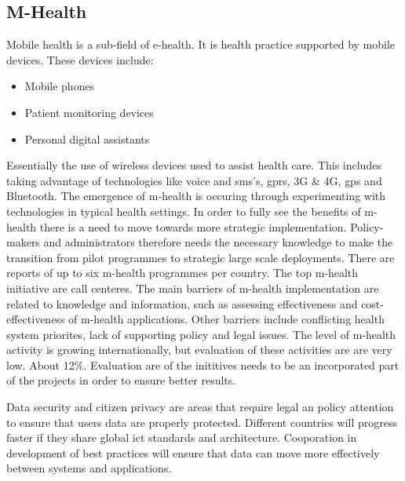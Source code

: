 \subsection{M-Health}
Mobile health is a sub-field of e-health. It is health practice supported by mobile devices.
These devices include:
\begin{itemize}
\item Mobile phones
\item Patient monitoring devices
\item Personal digital assistants
\end{itemize}
Essentially the use of wireless devices used to assist health care.
This includes taking advantage of technologies like voice and \gls{sms}'s, \gls{gprs}, 3G \& 4G, \gls{gps} and Bluetooth.
The emergence of m-health is occuring through experimenting with technologies in typical health settings. 
In order to fully see the benefits of m-health there is a need to move towards more strategic implementation. Policy-makers and administrators therefore needs the necessary knowledge to make the transition from pilot programmes to strategic large scale deployments.
There are reports of up to six m-health programmes per country.
The top m-health initiative are call centeres.
The main barriers of m-health implementation are related to knowledge and information, such as assessing effectiveness and cost-effectiveness of m-health applications.
Other barriers include conflicting health system priorites, lack of supporting policy and legal issues. 
The level of m-health activity is growing internationally, but evaluation of these activities are are very low. About 12\%. 
Evaluation are of the inititives needs to be an incorporated part of the projects in order to ensure better results.

Data security and citizen privacy are areas that require legal an policy attention to ensure that users data are properly protected.
Different countries will progress faster if they share global \gls{ict} standards and architecture. 
Cooporation in development of best practices will ensure that data can move more effectively between systems and applications.
\cite{mhealth:who}

